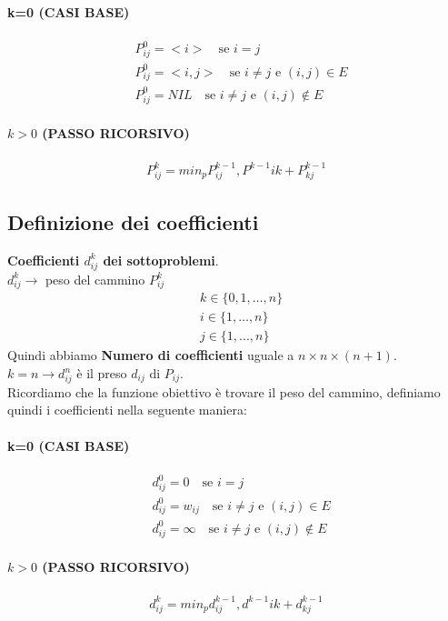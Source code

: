 \paragraph*{k=0 (CASI BASE)}
\begin{align*}
    &P^0_{ij} = <i> \quad \text{se } i = j\\
    &P^0_{ij} = <i, j> \quad \text{se } i \neq j \text{ e } (i,j) \in E\\
    &P^0_{ij} = NIL \quad \text{se } i \neq j \text{ e } (i,j) \notin E
\end{align*}
\paragraph*{$k>0$ (PASSO RICORSIVO)}
\begin{align*}
    P^k_{ij} = min_p{P^{k-1}_{ij}, P^{k-1}{ik} + P^{k-1}_{kj}}
\end{align*}
\subsection*{Definizione dei coefficienti}
\textbf{Coefficienti $d^k_{ij}$ dei sottoproblemi}.\\
$d^k_{ij} \rightarrow$ peso del cammino $P^k_{ij}$
\begin{align*}
    &k \in \{0,1,\dots,n\}\\
    &i \in \{1, \dots, n\}\\
    &j \in \{1,...,n\}
\end{align*}
Quindi abbiamo \textbf{Numero di coefficienti} uguale a $n \times n \times (n+1)$.\\
$k=n \rightarrow d^n_{ij}$ è il preso $d_{ij}$ di $P_{ij}$.\\
Ricordiamo che la funzione obiettivo è trovare il peso del cammino, definiamo quindi i
coefficienti nella seguente maniera:
\paragraph*{k=0 (CASI BASE)}
\begin{align*}
    &d^0_{ij} = 0 \quad \text{se } i = j\\
    &d^0_{ij} = w_{ij} \quad \text{se } i \neq j \text{ e } (i,j) \in E\\
    &d^0_{ij} = \infty \quad \text{se } i \neq j \text{ e } (i,j) \notin E
\end{align*}
\paragraph*{$k>0$ (PASSO RICORSIVO)}
\begin{align*}
    d^k_{ij} = min_p{d^{k-1}_{ij}, d^{k-1}{ik} + d^{k-1}_{kj}}
\end{align*}
